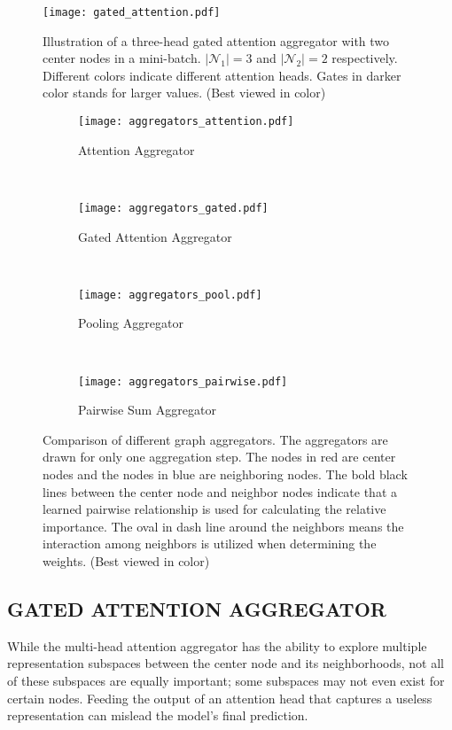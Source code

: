 \documentclass{article}
\begin{document}
	
\begin{figure}[bt!]
		\centering
		\texttt{[image: gated\_attention.pdf]}
		\caption{Illustration of a three-head gated attention aggregator with two center nodes in a mini-batch. $|\mathcal{N}_1|=3$ and $|\mathcal{N}_2|=2$ respectively. Different colors indicate different attention heads. Gates in darker color stands for larger values. (Best viewed in color)}
		\label{fig:GaAN}
	\end{figure}
	
	\begin{figure*}[tb!]
		\centering
		\begin{subfigure}[b]{0.213\textwidth}
			\centering
			\texttt{[image: aggregators\_attention.pdf]}
			\caption{ Attention Aggregator}\label{fig:attention}
		\end{subfigure}
		~
		\begin{subfigure}[b]{0.29\textwidth}
			\centering
			\texttt{[image: aggregators\_gated.pdf]}
			\caption{Gated Attention Aggregator}\label{fig:gated_attention}
		\end{subfigure}
		~
		\begin{subfigure}[b]{0.185\textwidth}
			\centering
			\texttt{[image: aggregators\_pool.pdf]}
			\caption{Pooling Aggregator}\label{fig:pooling}
		\end{subfigure}
		~
		\begin{subfigure}[b]{0.23\textwidth}
			\centering
			\texttt{[image: aggregators\_pairwise.pdf]}
			\caption{ Pairwise Sum Aggregator}\label{fig:pairwise}
		\end{subfigure}
		\caption{Comparison of different graph aggregators. The aggregators are drawn for only one aggregation step. The nodes in red are center nodes and the nodes in blue are neighboring nodes. The bold black lines between the center node and neighbor nodes indicate that a learned pairwise relationship is used for calculating the relative importance. The oval in dash line around the neighbors means the interaction among neighbors is utilized when determining the weights. (Best viewed in color)}
		\label{fig:aggregators}
\end{figure*}
	
\subsection{GATED ATTENTION AGGREGATOR}
	While the multi-head attention aggregator has the ability to explore multiple representation subspaces between the center node and its neighborhoods, not all of these subspaces are equally important; some subspaces may not even exist for certain nodes. Feeding the output of an attention head that captures a useless representation can mislead the model's final prediction.
	
\end{document}
